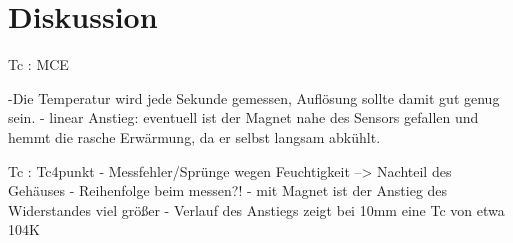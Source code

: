 \section{Diskussion}
\label{sec:Diskussion}

Tc : MCE

-Die Temperatur wird jede Sekunde gemessen, Auflösung sollte damit gut genug sein.
- linear Anstieg: eventuell ist der Magnet nahe des Sensors gefallen und hemmt
  die rasche Erwärmung, da er selbst langsam abkühlt.


Tc : Tc4punkt
- Messfehler/Sprünge wegen Feuchtigkeit --> Nachteil des Gehäuses
- Reihenfolge beim messen?!
- mit Magnet ist der Anstieg des Widerstandes viel größer
- Verlauf des Anstiegs zeigt bei 10mm eine Tc von etwa 104K
